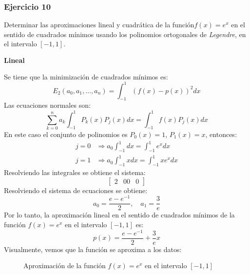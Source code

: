\documentclass{article}
\begin{document}
\subsubsection{Ejercicio 10}
Determinar las aproximaciones lineal y cuadrática de la función$f(x) = e^x$ en el sentido de cuadrados mínimos usando los polinomios ortogonales de \textit{Legendre}, en el intervalo $[-1,1]$.

\begin{center}
    \textbf{Lineal}
\end{center}
Se tiene que la minimización de cuadrados mínimos es:
\begin{equation*}
    E_2(a_0,a_1,\dots,a_n) = \int_{-1}^{1} (f(x) - p(x))^2 dx
\end{equation*}
Las ecuaciones normales son:
\begin{equation*}
    \sum_{k=0}^{n} a_k \int_{-1}^{1} P_k(x)P_j(x) dx = \int_{-1}^{1} f(x)P_j(x) dx
\end{equation*}
En este caso el conjunto de polinomios es $P_0(x) = 1$, $P_1(x) = x$, entonces:
\begin{align}
    j = 0 &\Rightarrow a_0 \int_{-1}^{1} dx = \int_{-1}^{1} e^x dx \\
    j = 1 &\Rightarrow a_0 \int_{-1}^{1} x dx = \int_{-1}^{1} xe^x dx
\end{align}
Resolviendo las integrales se obtiene el sistema:
\begin{equation}
    \begin{bmatrix}
        2 & 0 
        0 & 0
    \end{bmatrix}
\end{equation}
Resolviendo el sistema de ecuaciones se obtiene:
\begin{equation}
    a_0 = \frac{e - e^{-1}}{2}, \quad a_1 = \frac{3}{e}
\end{equation}
Por lo tanto, la aproximación lineal en el sentido de cuadrados mínimos de la función \( f(x) = e^x \) en el intervalo \([-1,1]\) es:
\begin{equation}
    p(x) = \frac{e - e^{-1}}{2} + \frac{3}{e}x
\end{equation}
\newpage
Visualmente, vemos que la función se aproxima a los datos:
\begin{figure}[h]
    \centering
    \caption{Aproximación de la función \( f(x) = e^x \) en el intervalo \([-1,1]\)}
    \label{fig:myplot13}
\end{figure}
\end{document}
